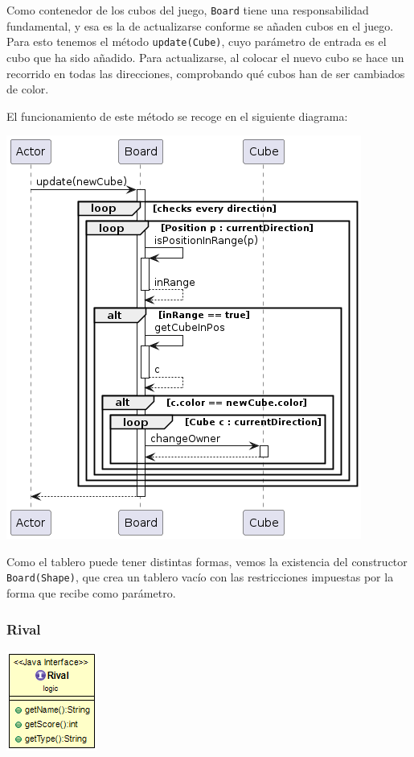 \documentclass[12pt,a4paper,openright]{book}
\theoremstyle{break}
\begin{document}
Como contenedor de los cubos del juego, \texttt{Board} tiene una responsabilidad fundamental, y esa es la de actualizarse conforme se añaden cubos en el juego. Para esto tenemos el método \texttt{update(Cube)}, cuyo parámetro de entrada es el cubo que ha sido añadido. Para actualizarse, al colocar el nuevo cubo se hace un recorrido en todas las direcciones, comprobando qué cubos han de ser cambiados de color.

El funcionamiento de este método se recoge en el siguiente diagrama:

\begin{center}
\includegraphics[scale=0.75]{Board.update()-sprint7.png} 
\end{center}

Como el tablero puede tener distintas formas, vemos la existencia del constructor \texttt{Board(Shape)}, que crea un tablero vacío con las restricciones impuestas por la forma que recibe como parámetro.

\newpage

\subsubsection{Rival}

\begin{center}
\includegraphics[scale=0.75]{Rival-sprint7.png} 
\end{center}
\end{document}

